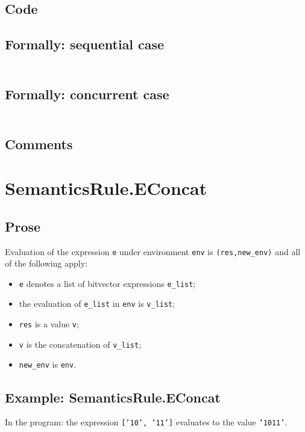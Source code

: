 \documentclass{book}
\begin{document}
  \subsection{Code}

  \subsection{Formally: sequential case}
  \begin{align}
  \end{align} 

  \subsection{Formally: concurrent case}
  \begin{align}
  \end{align} 

  \subsection{Comments}

\section{SemanticsRule.EConcat \label{sec:SemanticsRule.EConcat}}

  \subsection{Prose}
  Evaluation of the expression \texttt{e} under environment \texttt{env} is
  \texttt{(res,new\_env)} and all of the following apply:
  \begin{itemize}
  \item \texttt{e} denotes a list of bitvector expressions \texttt{e\_list};
  \item the evaluation of \texttt{e\_list} in \texttt{env} is \texttt{v\_list};
  \item \texttt{res} is a value \texttt{v};
  \item \texttt{v} is the concatenation of \texttt{v\_list};
  \item \texttt{new\_env} is \texttt{env}.
  \end{itemize}

  \subsection{Example: SemanticsRule.EConcat}
    In the program:
    the expression \texttt{['10', '11']} evaluates to the value \texttt{'1011'}.
\end{document}
